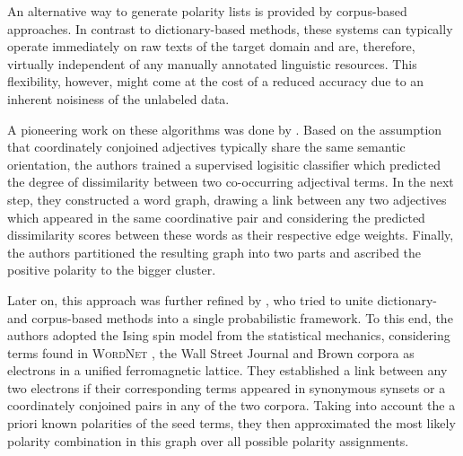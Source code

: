 An alternative way to generate polarity lists is provided by
corpus-based approaches.  In contrast to dictionary-based methods,
these systems can typically operate immediately on raw texts of the
target domain and are, therefore, virtually independent of any
manually annotated linguistic resources.  This flexibility, however,
might come at the cost of a reduced accuracy due to an inherent
noisiness of the unlabeled data.

A pioneering work on these algorithms was done by
\citet{Hatzivassi:97}.  Based on the assumption that coordinately
conjoined adjectives typically share the same semantic orientation,
the authors trained a supervised logisitic classifier which predicted
the degree of dissimilarity between two co-occurring adjectival terms.
In the next step, they constructed a word graph, drawing a link
between any two adjectives which appeared in the same coordinative
pair and considering the predicted dissimilarity scores between these
words as their respective edge weights.  Finally, the authors
partitioned the resulting graph into two parts and ascribed the
positive polarity to the bigger cluster.

Later on, this approach was further refined by \citet{Takamura:05},
who tried to unite dictionary- and corpus-based methods into a single
probabilistic framework.  To this end, the authors adopted the Ising
spin model from the statistical mechanics, considering terms found in
\textsc{WordNet} \cite{Miller:95}, the Wall Street Journal and Brown
corpora as electrons in a unified ferromagnetic lattice.  They
established a link between any two electrons if their corresponding
terms appeared in synonymous synsets or a coordinately conjoined pairs
in any of the two corpora.  Taking into account the a priori known
polarities of the seed terms, they then approximated the most likely
polarity combination in this graph over all possible polarity
assignments.

